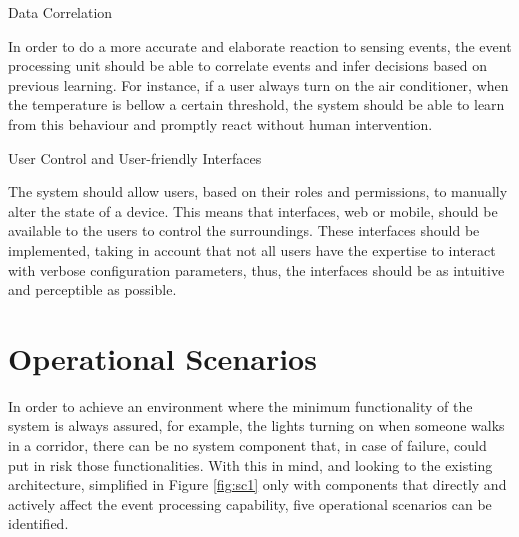 \begin{Paragraph}{Data Correlation}

In order to do a more accurate and elaborate reaction to sensing events, the event processing unit should be able to correlate events and infer decisions based on previous learning. For instance, if a user always turn on the air conditioner, when the temperature is bellow a certain threshold, the system should be able to learn from this behaviour and promptly react without human intervention.

\end{Paragraph}

\begin{Paragraph}{User Control and User-friendly Interfaces}
	
The system should allow users, based on their roles and permissions, to manually alter the state of a device. This means that interfaces, web or mobile, should be available to the users to control the surroundings. These interfaces should be implemented, taking in account that not all users have the expertise to interact with verbose configuration parameters, thus, the interfaces should be as intuitive and perceptible as possible.

	
\end{Paragraph}




\section{Operational Scenarios}
\label{Architecture:usecases}

In order to achieve an environment where the minimum functionality of the system is always assured, for example, the lights turning on when someone walks in a corridor, there can be no system component that, in case of failure, could put in risk those functionalities. With this in mind, and looking to the existing architecture, simplified in Figure \ref{fig:sc1} only with components that directly and actively affect the event processing capability, five operational scenarios can be identified. 


